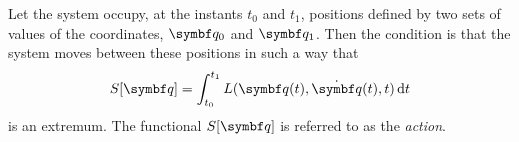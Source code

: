 Let the system occupy, at the instants \(t_0\) and \(t_1\), positions defined by two sets of values of the coordinates,
\(\vct{q}_0\) and \(\vct{q}_1\). Then the condition is that the system moves between these positions in such a way that
\[
  S[\vct{q}] = \int_{t_0}^{t_1} L(\vct{q}(t), \dot{\vct{q}}(t), t) \diff t
\]
is an extremum. The functional \(S[\vct{q}]\) is referred to as the \emph{action}.

\Edc
